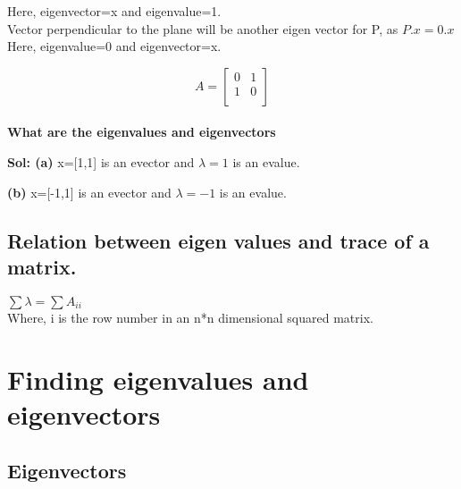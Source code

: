 \documentclass[]{article}
\begin{document}
	\noindent
	Here, eigenvector=x and eigenvalue=1.\\
	
	\noindent
	Vector perpendicular to the plane will be another eigen vector for P, as $P.x=0.x$\\
	
	\noindent
	Here, eigenvalue=0 and eigenvector=x.\\
	
	\begin{mytheorem}[title=Example 1]
		\[
		A=\begin{bmatrix}
			0&1\\
			1&0\\
		\end{bmatrix}
		\]\\
		
		\noindent
		\textbf{What are the eigenvalues and eigenvectors}
		
		\noindent
		\textbf{Sol: (a)} x=[1,1] is an evector and $\lambda =1$ is an evalue.
		
		\noindent
		\textbf{(b)} x=[-1,1] is an evector and $\lambda = -1$ is an evalue.
	
		
	\end{mytheorem}

\vspace{10pt}

\subsection{Relation between eigen values and trace of a matrix.}
\vspace{10pt}

$\sum{\lambda} = \sum{A_{ii}}$\\

\noindent
Where, i is the row number in an n*n dimensional squared matrix.\\

\vspace{10pt}

\section{Finding eigenvalues and eigenvectors}

\vspace{10pt}

\subsection{Eigenvectors}
\end{document}
